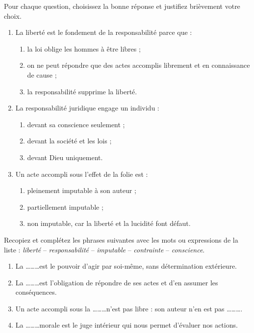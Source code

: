 \documentclass[11pt]{article}
\begin{document}
\begin{exercice}[QCM]
Pour chaque question, choisissez la bonne réponse et justifiez brièvement votre choix.
\begin{enumerate}
\item La liberté est le fondement de la responsabilité parce que :
\begin{enumerate}
\item[a)] la loi oblige les hommes à être libres ;
\item[b)] on ne peut répondre que des actes accomplis librement et en connaissance de cause ;
\item[c)] la responsabilité supprime la liberté.
\end{enumerate}
\item La responsabilité juridique engage un individu :
\begin{enumerate}
\item[a)] devant sa conscience seulement ;
\item[b)] devant la société et les lois ;
\item[c)] devant Dieu uniquement.
\end{enumerate}
\item Un acte accompli sous l'effet de la folie est :
\begin{enumerate}
\item[a)] pleinement imputable à son auteur ;
\item[b)] partiellement imputable ;
\item[c)] non imputable, car la liberté et la lucidité font défaut.
\end{enumerate}
\end{enumerate}
\end{exercice}

\begin{exercice}
Recopiez et complétez les phrases suivantes avec les mots ou expressions de la liste : \textit{liberté} -- \textit{responsabilité} -- \textit{imputable} -- \textit{contrainte} -- \textit{conscience}.
\begin{enumerate}
\item La \ldots\ldots\ldots est le pouvoir d'agir par soi-même, sans détermination extérieure.
\item La \ldots\ldots\ldots est l'obligation de répondre de ses actes et d'en assumer les conséquences.
\item Un acte accompli sous la \ldots\ldots\ldots n'est pas libre : son auteur n'en est pas \ldots\ldots\ldots .
\item La \ldots\ldots\ldots morale est le juge intérieur qui nous permet d'évaluer nos actions.
\end{enumerate}
\end{exercice}
\end{document}
